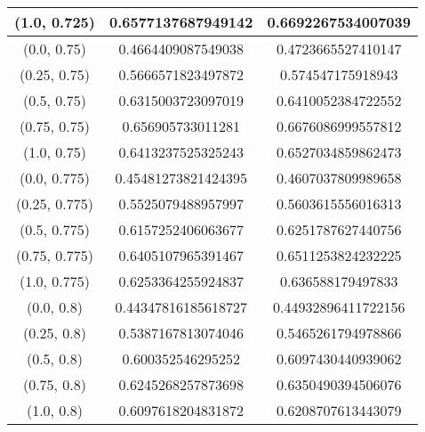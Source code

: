 \begin{table}[H]
\begin{tabular}{|c|c|c|}
\hline
(1.0, 0.725) & 0.6577137687949142 & 0.6692267534007039 \\
\hline
\hline
(0.0, 0.75) & 0.4664409087549038 & 0.4723665527410147 \\
\hline
(0.25, 0.75) & 0.5666571823497872 & 0.574547175918943 \\
\hline
(0.5, 0.75) & 0.6315003723097019 & 0.6410052384722552 \\
\hline
(0.75, 0.75) & 0.656905733011281 & 0.6676086999557812 \\
\hline
(1.0, 0.75) & 0.6413237525325243 & 0.6527034859862473 \\
\hline
\hline
(0.0, 0.775) & 0.45481273821424395 & 0.4607037809989658 \\
\hline
(0.25, 0.775) & 0.5525079488957997 & 0.5603615556016313 \\
\hline
(0.5, 0.775) & 0.6157252406063677 & 0.6251787627440756 \\
\hline
(0.75, 0.775) & 0.6405107965391467 & 0.6511253824232225 \\
\hline
(1.0, 0.775) & 0.6253364255924837 & 0.636588179497833 \\
\hline
\hline
(0.0, 0.8) & 0.44347816185618727 & 0.44932896411722156 \\
\hline
(0.25, 0.8) & 0.5387167813074046 & 0.5465261794978866 \\
\hline
(0.5, 0.8) & 0.600352546295252 & 0.6097430440939062 \\
\hline
(0.75, 0.8) & 0.6245268257873698 & 0.6350490394506076 \\
\hline
(1.0, 0.8) & 0.6097618204831872 & 0.6208707613443079 \\
\hline
\end{tabular}
\end{table}

